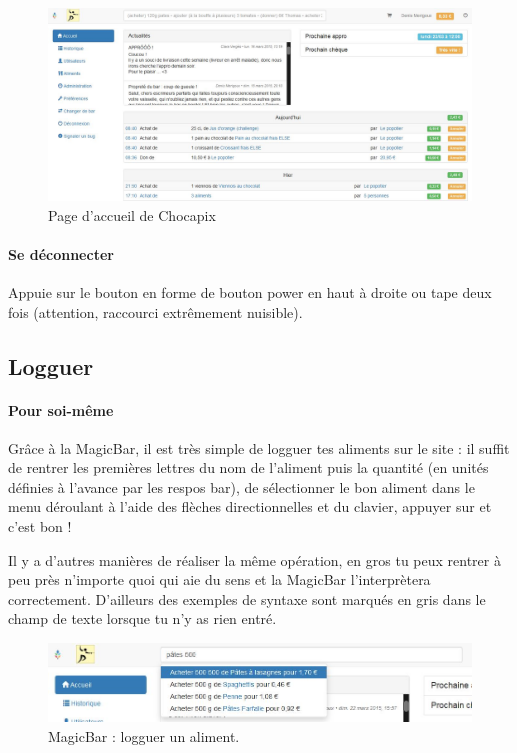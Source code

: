 \documentclass[12pt,french]{article}
\begin{document}
\begin{figure}[h]
\centering
\includegraphics[width=16cm]{images/home}
\caption{Page d'accueil de Chocapix\label{home}}
\end{figure}

\paragraph{Se déconnecter} Appuie sur le bouton  en forme de bouton power en haut à droite ou tape deux fois  (attention, raccourci extrêmement nuisible).

\subsection{Logguer}

\paragraph{Pour soi-même} Grâce à la MagicBar\texttrademark{}, il est très simple de logguer tes aliments sur le site : il suffit de rentrer les premières lettres du nom de l'aliment puis la quantité (en unités définies à l'avance par les respos bar), de sélectionner le bon aliment dans le menu déroulant à l'aide des flèches directionnelles \keys{$\uparrow$} et \keys{$\downarrow$} du clavier, appuyer sur  et c'est bon !

Il y a d'autres manières de réaliser la même opération, en gros tu peux rentrer à peu près n'importe quoi qui aie du sens et la MagicBar\texttrademark{} l'interprètera correctement. D'ailleurs des exemples de syntaxe sont marqués en gris dans le champ de texte lorsque tu n'y as rien entré.

\begin{figure}[h]
\centering
\includegraphics[width=16cm]{images/log}
\caption{MagicBar\texttrademark{} : logguer un aliment.}
\end{figure}
\end{document}
